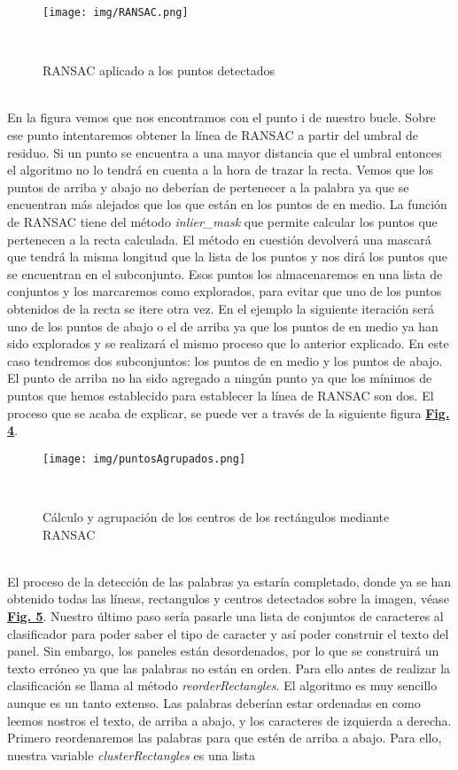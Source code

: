 \documentclass[a4paper, 12pt]{article}
\begin{document}
\begin{figure}[h]
	\centering
	\texttt{[image: img/RANSAC.png]}
 	\caption{RANSAC aplicado a los puntos detectados}\
	\label{fig:normalizacion}
\end{figure}
\\ En la figura vemos que nos encontramos con el punto i de nuestro bucle. Sobre ese punto intentaremos obtener la línea de RANSAC a partir del umbral de residuo. Si un punto se encuentra a una mayor distancia que el umbral entonces el algoritmo no lo tendrá en cuenta a la hora de trazar la recta. Vemos que los puntos de arriba y abajo no deberían de pertenecer a la palabra ya que se encuentran más alejados que los que están en los puntos de en medio. La función de RANSAC tiene del método \textit{inlier\_mask} que permite calcular los puntos que pertenecen a la recta calculada. El método en cuestión devolverá una mascará que tendrá la misma longitud que la lista de los puntos y nos dirá  los puntos que se encuentran en el subconjunto. Esos puntos los almacenaremos en una lista de conjuntos y los marcaremos como explorados, para evitar que uno de los puntos obtenidos de la recta se itere otra vez. En el ejemplo la siguiente iteración será uno de los puntos de abajo o el de arriba ya que los puntos de en medio ya han sido explorados y se realizará el mismo proceso que lo anterior explicado. En este caso tendremos dos subconjuntos: los puntos de en medio y los puntos de abajo. El punto de arriba no ha sido agregado a ningún punto ya que los mínimos de puntos que hemos establecido para establecer la línea de RANSAC son dos. El proceso que se acaba de explicar, se puede ver a través de la siguiente figura \textbf{\hyperref[fig:puntosAgrupados]{Fig. 4}}.
\begin{figure}[h]
	\centering
	\texttt{[image: img/puntosAgrupados.png]}
 	\caption{Cálculo y agrupación de los centros de los rectángulos mediante RANSAC}\
	\label{fig:puntosAgrupados}
\end{figure}
\\El proceso de la detección de las palabras ya estaría completado, donde ya se han obtenido todas las líneas, rectangulos y centros detectados sobre la imagen, véase \textbf{\hyperref[fig:imagenDetectada]{Fig. 5}}. Nuestro último paso sería pasarle una lista de conjuntos de caracteres al clasificador para poder saber el tipo de caracter y así poder construir el texto del panel. Sin embargo, los paneles están desordenados, por lo que se construirá un texto erróneo ya que las palabras no están en orden. Para ello antes de realizar la clasificación se llama al método \textit{reorderRectangles}. El algoritmo es muy sencillo aunque es un tanto extenso. Las palabras deberían estar ordenadas en como leemos nostros el texto, de arriba a abajo, y los caracteres de izquierda a derecha. Primero reordenaremos las palabras para que estén de arriba a abajo. Para ello, nuestra variable \textit{clusterRectangles} es una lista 
\end{document}
